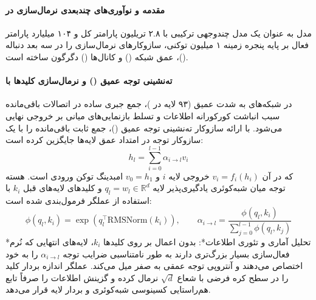 \item {}

\paragraph*{مقدمه و نوآوری‌های چندبعدی نرمال‌سازی در }
مدل  \cite{kimi2026k3} به عنوان یک مدل چندوجهی ترکیبی با ۲.۸ تریلیون پارامتر کل و ۱۰۴ میلیارد پارامتر فعال بر پایه پنجره زمینه ۱ میلیون توکنی، سازوکارهای نرمال‌سازی را در سه بعد دنباله ()، عمق شبکه () و کانال‌ها () دگرگون ساخته است.

\paragraph*{ته‌نشینی توجه عمیق () و نرمال‌سازی کلیدها با }
در شبکه‌های به شدت عمیق (۹۳ لایه در )، جمع جبری ساده در اتصالات باقی‌مانده سبب انباشت کورکورانه اطلاعات و تسلط بازنمایی‌های میانی بر خروجی نهایی می‌شود.  با ارائه سازوکار ته‌نشینی توجه عمیق ()، جمع ثابت باقی‌مانده را با یک سازوکار توجه در امتداد عمق لایه‌ها جایگزین کرده است:
\begin{equation}
    h_l = \sum_{i=0}^{l-1} \alpha_{i \to l} v_i
\end{equation}
که در آن $v_i = f_i(h_i)$ خروجی لایه $i$ و $v_0 = h_1$ امبدینگ توکن ورودی است. هسته توجه میان شبه‌کوئری یادگیری‌پذیر لایه $q_l = w_l \in \mathbb{R}^d$ و کلیدهای لایه‌های قبل $k_i$ با استفاده از عملگر  فرمول‌بندی شده است:
\begin{equation}
    \phi(q_l, k_i) = \exp\left( q_l^\top \text{RMSNorm}(k_i) \right), \qquad \alpha_{i \to l} = \frac{\phi(q_l, k_i)}{\sum_{j=0}^{l-1} \phi(q_l, k_j)}
\end{equation}
*تحلیل آماری و تئوری اطلاعات*: بدون اعمال  بر روی کلیدها $k_i$، لایه‌های انتهایی که نُرم فعال‌سازی بسیار بزرگ‌تری دارند به طور نامتناسبی ضرایب توجه $\alpha_{i \to l}$ را به خود اختصاص می‌دهند و آنتروپی توجه عمقی به صفر میل می‌کند. عملگر  اندازه بردار کلید را در سطح کره فرضی با شعاع $\sqrt{d}$ نرمال کرده و گزینش اطلاعات را صرفاً تابع هم‌راستایی کسینوسی شبه‌کوئری و بردار لایه قرار می‌دهد.

